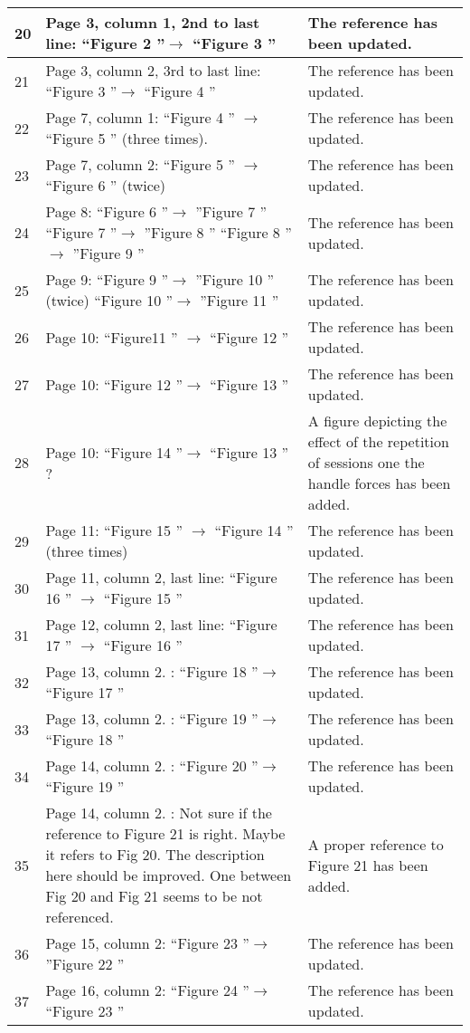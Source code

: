 \documentclass[12pt,a4paper]{article}
\begin{document}
\begin{longtable}[!h]{|p{0.3cm}|p{8.5cm}||p{9cm}|}
20	& Page 3, column 1, 2nd to last line:  ``Figure 2 ''$\rightarrow$  ``Figure 3 '' & The reference has been updated.\tabularnewline \hline
21	& Page 3, column 2, 3rd to last line:  ``Figure 3 ''$\rightarrow$  ``Figure 4 '' & The reference has been updated.\tabularnewline \hline
22	& Page 7, column 1:  ``Figure 4 '' $\rightarrow$  ``Figure 5 '' (three times). & The reference has been updated.\tabularnewline \hline
23	& Page 7, column 2:  ``Figure 5 '' $\rightarrow$  ``Figure 6 '' (twice) & The reference has been updated.\tabularnewline \hline
24	& Page 8:  ``Figure 6 ''$\rightarrow$ ''Figure 7 ''   ``Figure 7 ''$\rightarrow$ ''Figure 8 ''  ``Figure 8 ''$\rightarrow$ ''Figure 9 '' & The reference has been updated.\tabularnewline \hline
25	& Page 9:  ``Figure 9 ''$\rightarrow$ ''Figure 10 '' (twice)   ``Figure 10 ''$\rightarrow$ ''Figure 11 '' & The reference has been updated.\tabularnewline \hline
26	& Page 10:  ``Figure11 '' $\rightarrow$  ``Figure 12 '' & The reference has been updated.\tabularnewline \hline
27	& Page 10:  ``Figure 12 ''$\rightarrow$  ``Figure 13 '' & The reference has been updated.\tabularnewline \hline
28	& Page 10:  ``Figure 14 ''$\rightarrow$  ``Figure 13 '' ? & A figure depicting the effect of the repetition of sessions one the handle forces has been added.\tabularnewline \hline
29	& Page 11:  ``Figure 15 '' $\rightarrow$  ``Figure 14 '' (three times) & The reference has been updated.\tabularnewline \hline
30	& Page 11, column 2, last line:  ``Figure 16 '' $\rightarrow$  ``Figure 15 '' & The reference has been updated.\tabularnewline \hline
31	& Page 12, column 2, last line:  ``Figure 17 '' $\rightarrow$  ``Figure 16 '' & The reference has been updated.\tabularnewline \hline
32	& Page 13, column 2. :  ``Figure 18 ''$\rightarrow$  ``Figure 17 '' & The reference has been updated.\tabularnewline \hline
33	& Page 13, column 2. :  ``Figure 19 ''$\rightarrow$  ``Figure 18 '' & The reference has been updated.\tabularnewline \hline
34	& Page 14, column 2. :  ``Figure 20 ''$\rightarrow$  ``Figure 19 '' & The reference has been updated.\tabularnewline \hline
35	& Page 14, column 2. : Not sure if the reference to Figure 21 is right. Maybe it refers to Fig 20. The description here should be improved. One between Fig 20 and Fig 21 seems to be not referenced. & A proper reference to Figure 21 has been added.\tabularnewline \hline
36	& Page 15, column 2:  ``Figure 23 ''$\rightarrow$ ''Figure 22 '' & The reference has been updated.\tabularnewline \hline
37	& Page 16, column 2:  ``Figure 24 ''$\rightarrow$  ``Figure 23 '' & The reference has been updated.\tabularnewline \hline

\end{longtable}
\end{document}
